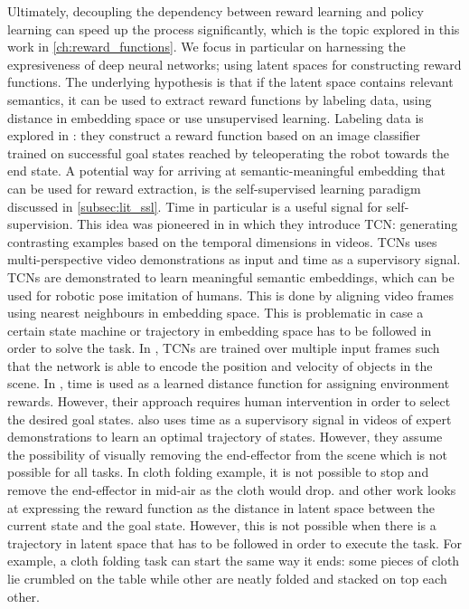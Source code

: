 \documentclass[\home/main.tex]{subfiles}
\begin{document}
Ultimately, decoupling the dependency between reward learning and policy learning can speed up the process significantly, which is the topic explored in this work in \cref{ch:reward_functions}. We focus in particular on harnessing the expresiveness of deep neural networks; using latent spaces for constructing reward functions. The underlying hypothesis is that if the latent space contains relevant semantics, it can be used to extract reward functions by labeling data, using distance in embedding space or use unsupervised learning. Labeling data is explored in \autocite{Singh2019}: they construct a reward function based on an image classifier trained on successful goal states reached by teleoperating the robot towards the end state. A potential way for arriving at semantic-meaningful embedding that can be used for reward extraction, is the self-supervised learning paradigm discussed in \cref{subsec:lit_ssl}. Time in particular is a useful signal for self-supervision. This idea was pioneered in \autocite{Sermanet2017TCN} in which they introduce \gls{TCN}: generating contrasting examples based on the temporal dimensions in videos. \glspl{TCN} uses multi-perspective video demonstrations as input and time as a supervisory signal. \Glspl{TCN} are demonstrated to learn meaningful semantic embeddings, which can be used for robotic pose imitation of humans. This is done by aligning video frames using nearest neighbours in embedding space. This is problematic in case a certain state machine or trajectory in embedding space has to be followed in order to solve the task. In \autocite{Dwibedi2018mfTCN}, TCNs are trained over multiple input frames such that the network is able to encode the position and velocity of objects in the scene. In \autocite{Hartikainen2019}, time is used as a learned distance function for assigning environment rewards. However, their approach requires human intervention in order to select the desired goal states.  \autocite{Nair2018time} also uses time as a supervisory signal in videos of expert demonstrations to learn an optimal trajectory of states. However, they assume the possibility of visually removing the end-effector from the scene which is not possible for all tasks. In cloth folding example, it is not possible to stop and remove the end-effector in mid-air as the cloth would drop.
\autocite{Sermanet2017TCN} and other work \autocite{Nair2018visual} looks at expressing the reward function as the distance in latent space between the current state and the goal state. However, this is not possible when there is a trajectory in latent space that has to be followed in order to execute the task. For example, a cloth folding task can start the same way it ends: some pieces of cloth lie crumbled on the table while other are neatly folded and stacked on top each other.   
\end{document}
